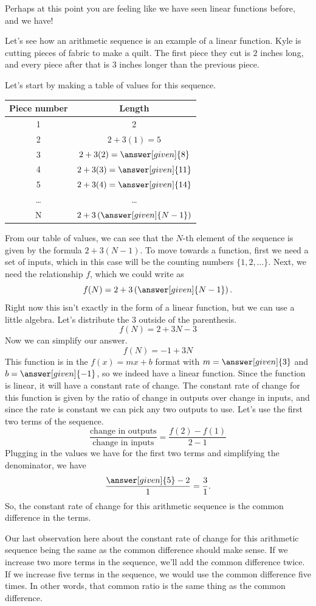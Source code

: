 \documentclass{ximera}
\begin{document}
Perhaps at this point you are feeling like we have seen linear functions before, and we have!
\begin{example}
Let's see how an arithmetic sequence is an example of a linear function. Kyle is cutting pieces of fabric to make a quilt. The first piece they cut is $2$ inches long, and every piece after that is $3$ inches longer than the previous piece. 

Let's start by making a table of values for this sequence.
\begin{image}
\begin{tabular}{c|c}
Piece number & Length \\ \hline
1 & 2 \\ \hline
2 & $2+3(1)=5$ \\ \hline
3 & $2+3(2) = \answer[given]{8}$ \\ \hline
4 & $2+3(3) = \answer[given]{11}$ \\ \hline
5 & $2+3(4) = \answer[given]{14}$ \\ \hline
\dots & \dots \\ \hline
N & $2+3\left( \answer[given]{N-1}\right )$ \\ \hline
\end{tabular}
\end{image}
From our table of values, we can see that the $N$-th element of the sequence is given by the formula $2+3(N-1)$. To move towards a function, first we need a set of inputs, which in this case will be the counting numbers $\{1, 2, \dots \}$. Next, we need the relationship $f$, which we could write as
\[
f(N) = 2+3\left ( \answer[given]{N-1} \right ).
\]
Right now this isn't exactly in the form of a linear function, but we can use a little algebra. Let's distribute the $3$ outside of the parenthesis.
\[
f(N) = 2+3N - 3
\]
Now we can simplify our answer.
\[
f(N) = -1 + 3N
\]
This function is in the $f(x) = mx+b$ format with $m=\answer[given]{3}$ and $b=\answer[given]{-1}$, so we indeed have a linear function. Since the function is linear, it will have a constant rate of change. The constant rate of change for this function is given by the ratio of change in outputs over change in inputs, and since the rate is constant we can pick any two outputs to use. Let's use the first two terms of the sequence.
\[
\frac{\textrm{change in outputs}}{\textrm{change in inputs}} = \frac{f(2)-f(1)}{2-1}
\]
Plugging in the values we have for the first two terms and simplifying the denominator, we have
\[
\frac{\answer[given]{5} - 2}{1} = \frac{3}{1}.
\]
So, the constant rate of change for this arithmetic sequence is the common difference in the terms.

\end{example}
Our last observation here about the constant rate of change for this arithmetic sequence being the same as the common difference should make sense. If we increase two more terms in the sequence, we'll add the common difference twice. If we increase five terms in the sequence, we would use the common difference five times. In other words, that common ratio is the same thing as the common difference.
\end{document}
